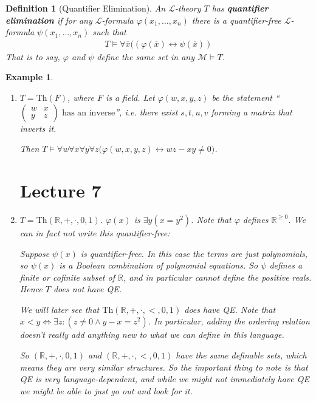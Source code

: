 \documentclass[]{article}
\theoremstyle{custhm}
\theoremstyle{cusdef}
\newtheorem{defin}[theorem]{Definition}
\theoremstyle{custhm}
\theoremstyle{custhm}
\theoremstyle{custhm}
\theoremstyle{ex}
\newtheorem{ex}[theorem]{Example}
\theoremstyle{custhm}
\theoremstyle{cusdef}
\theoremstyle{remark}
\theoremstyle{remark}
\newcommand{\R}{\mathbb{R}}
\newcommand{\undf}[1]{\textit{\textbf{#1}}}
\renewcommand{\L}{\mathcal{L}}
\renewcommand{\it}[1]{\textit{#1}}
\newcommand{\M}{\mathcal{M}}
\renewcommand{\phi}{\varphi}
\renewcommand{\bar}{\overline}
\newcommand{\Th}{\textrm{Th}}
\begin{document}
\begin{defin}[Quantifier Elimination]
An $\L$-theory $T$ has \undf{quantifier elimination} if for any $\L$-formula $\phi(x_1,\dots,x_n)$ there is a quantifier-free $\L$-formula $\psi(x_1,\dots,x_n)$ such that
\begin{align*}
T\models \forall \bar{x}\big((\phi(\bar{x})\leftrightarrow \psi(\bar{x}))
\end{align*}
That is to say, $\phi$ and $\psi$ define the same set in any $\M\models T$.
\end{defin}

\begin{ex}\ 
\begin{enumerate}[label=(\arabic*)]
\item $T = \Th(F)$, where $F$ is a field. Let $\phi(w,x,y,z)$ be the statement ``$\left(\begin{array}{cc} w & x\\ y & z\end{array}\right)\textrm{ has an inverse}$'', {\it i.e.} there exist $s,t,u,v$ forming a matrix that inverts it.

Then $T\models \forall w\forall x\forall y\forall z\big(\phi(w,x,y,z)\leftrightarrow wz-xy\ne 0\big)$.

\section{Lecture 7}

\item $T = \Th(\R,+,\cdot,0,1)$. $\phi(x)$ is $\exists y(x = y^2)$. Note that $\phi$ defines $\R^{\ge 0}$. We can in fact not write this quantifier-free:

Suppose $\psi(x)$ is quantifier-free. In this case the terms are just polynomials, so $\psi(x)$ is a Boolean combination of polynomial equations. So $\psi$ defines a finite or cofinite subset of $\R$, and in particular cannot define the positive reals. Hence $T$ does not have QE.

We will later see that $\Th(\R,+,\cdot,<,0,1)$ {\it does} have QE. Note that $x < y \iff \exists z: (z\ne 0 \land y-x = z^2)$. In particular, adding the ordering relation doesn't really add anything new to what we can define in this language.

So $(\R,+,\cdot,0,1)$ and $(\R,+,\cdot,<,0,1)$ have the same definable sets, which means they are very similar structures. So the important thing to note is that QE is very language-dependent, and while we might not immediately have QE we might be able to just go out and look for it.
\end{enumerate}
\end{ex}
\end{document}
